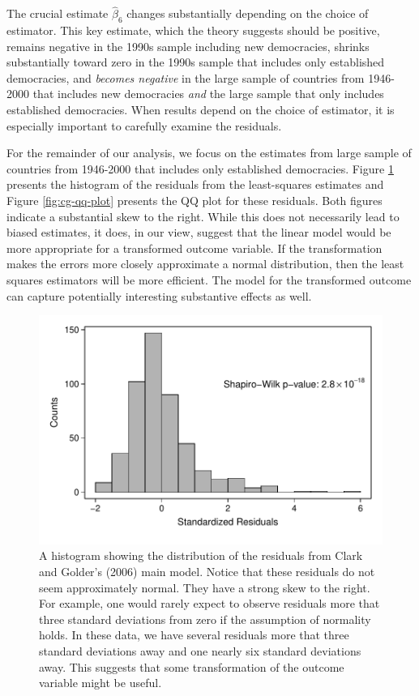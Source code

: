\documentclass[12pt]{article}
\begin{document}
The crucial estimate $\hat{\beta}_6$ changes substantially depending on the choice of estimator. 
This key estimate, which the theory suggests should be positive, remains negative in the 1990s sample including new democracies, shrinks substantially toward zero in the 1990s sample that includes only established democracies, and \textit{becomes negative} in the large sample of countries from 1946-2000 that includes new democracies \textit{and} the large sample that only includes established democracies. 
When results depend on the choice of estimator, it is especially important to carefully examine the residuals.

For the remainder of our analysis, we focus on the estimates from large sample of countries from 1946-2000 that includes only established democracies. 
Figure \ref{fig:cg-residuals-hist} presents the histogram of the residuals from the least-squares estimates and Figure \ref{fig:cg-qq-plot} presents the QQ plot for these residuals. 
Both figures indicate a substantial skew to the right. 
While this does not necessarily lead to biased estimates, it does, in our view, suggest that the linear model would be more appropriate for a transformed outcome variable. 
If the transformation makes the errors more closely approximate a normal distribution, then the least squares estimators will be more efficient. 
The model for the transformed outcome can capture potentially interesting substantive effects as well.

\begin{figure}[h!]
\begin{center}
\includegraphics[scale = 0.6]{figs/cg-residuals-hist.pdf}
\caption{A histogram showing the distribution of the residuals from Clark and Golder's (2006) main model. 
Notice that these residuals do not seem approximately normal. They have a strong skew to the right. 
For example, one would rarely expect to observe residuals more that three standard deviations from zero if the assumption of normality holds. 
In these data, we have several residuals more that three standard deviations away and one nearly six standard deviations away. 
This suggests that some transformation of the outcome variable might be useful.}\label{fig:cg-residuals-hist}	
\end{center}
\end{figure}
\end{document}
